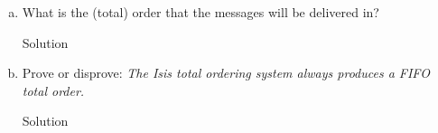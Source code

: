 \documentclass{article}
\begin{document}
\begin{spacing}{1.1}
\begin{homeworkProblem}
\begin{enumerate}[(a)]
\begin{homeworkSection}{Solution}
			\end{homeworkSection}
		\item What is the (total) order that the messages will be delivered in?
			\begin{homeworkSection}{Solution}
		
			\end{homeworkSection}
		\item Prove or disprove: \emph{The Isis total ordering system always produces a FIFO total order.}
			\begin{homeworkSection}{Solution}
		
			\end{homeworkSection}
	\end{enumerate}
\end{homeworkProblem}

\end{spacing}
\end{document}
